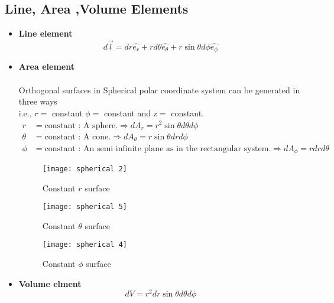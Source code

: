 		\subsection{Line, Area ,Volume Elements}
		\begin{itemize}
			\item\textbf{ Line element}$$d \vec{{l}}=d r \hat{e_{r}}+r d \theta \hat{e_{\theta}}+r \sin \theta d \phi \hat{e_{\phi}}$$
			\item \textbf{Area element}\\
			\\ Orthogonal surfaces in Spherical polar coordinate system can be generated in three ways \\ i.e., $r=$ constant $\phi=$ constant and 
			$\mathrm{z}=$ constant.
			\begin{align*}
			r&= \text{constant : A sphere.}\Rightarrow d A_{r}=r^{2} \sin \theta d \theta d \phi  \\
			\theta&=\text{constant : A cone.} \Rightarrow d A_{\theta}=r \sin \theta d r d \phi \\
			\phi&= \text{constant : An semi infinite plane as in the rectangular system.} \Rightarrow d A_{\phi}=r d r d \theta 
			\end{align*}
			
			\begin{figure}[h]
				\begin{minipage}{0.30\textwidth}
					\texttt{[image: spherical 2]}
					\caption{Constant $r$ surface}
				\end{minipage}\hspace{0.5cm}
				\begin{minipage}{0.35\textwidth}
					\texttt{[image: spherical 5]}
					\caption{Constant $\theta$ surface}
				\end{minipage}
				\begin{minipage}{0.30\textwidth}
					\texttt{[image: spherical 4]}
					\caption{Constant $\phi$ surface}
				\end{minipage}
			\end{figure}
			
			\item \textbf{Volume elment}
			$$
			d V=r^{2}d r \sin \theta d \theta d \phi 
			$$
		\end{itemize}
		
